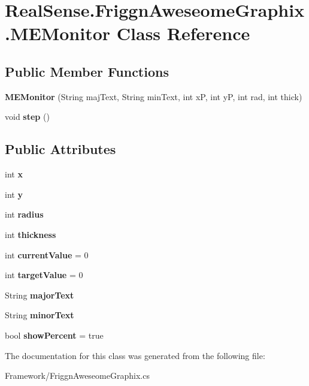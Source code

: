 \section{Real\+Sense.\+Friggn\+Aweseome\+Graphix.\+M\+E\+Monitor Class Reference}
\label{class_real_sense_1_1_friggn_aweseome_graphix_1_1_m_e_monitor}
\subsection*{Public Member Functions}
\begin{DoxyCompactItemize}
\item 
\mbox{\label{class_real_sense_1_1_friggn_aweseome_graphix_1_1_m_e_monitor_a8df7ffb411949e73cc37344326d325a3}} 
{\bfseries M\+E\+Monitor} (String maj\+Text, String min\+Text, int xP, int yP, int rad, int thick)
\item 
\mbox{\label{class_real_sense_1_1_friggn_aweseome_graphix_1_1_m_e_monitor_a59efc180805be50c7ed2a7b37e0aa0ef}} 
void {\bfseries step} ()
\end{DoxyCompactItemize}
\subsection*{Public Attributes}
\begin{DoxyCompactItemize}
\item 
\mbox{\label{class_real_sense_1_1_friggn_aweseome_graphix_1_1_m_e_monitor_aae94a9af9eba40d10677cffeee537737}} 
int {\bfseries x}
\item 
\mbox{\label{class_real_sense_1_1_friggn_aweseome_graphix_1_1_m_e_monitor_a05c8b06b952fbdfff729f92498996212}} 
int {\bfseries y}
\item 
\mbox{\label{class_real_sense_1_1_friggn_aweseome_graphix_1_1_m_e_monitor_aac6a6a6847e001a75e2b2316386ee864}} 
int {\bfseries radius}
\item 
\mbox{\label{class_real_sense_1_1_friggn_aweseome_graphix_1_1_m_e_monitor_abb4069ab5c96cb77807c8ec988073bb0}} 
int {\bfseries thickness}
\item 
\mbox{\label{class_real_sense_1_1_friggn_aweseome_graphix_1_1_m_e_monitor_adc8792c41789b6f038d7dc5d5c6e7496}} 
int {\bfseries current\+Value} = 0
\item 
\mbox{\label{class_real_sense_1_1_friggn_aweseome_graphix_1_1_m_e_monitor_aa73071b1e565f6765783baf18ce5b2c7}} 
int {\bfseries target\+Value} = 0
\item 
\mbox{\label{class_real_sense_1_1_friggn_aweseome_graphix_1_1_m_e_monitor_a4cdd7aad6b3e84b9429518891618b195}} 
String {\bfseries major\+Text}
\item 
\mbox{\label{class_real_sense_1_1_friggn_aweseome_graphix_1_1_m_e_monitor_a6bbf9a1ee06067597b933da3e34e3ee5}} 
String {\bfseries minor\+Text}
\item 
\mbox{\label{class_real_sense_1_1_friggn_aweseome_graphix_1_1_m_e_monitor_a4a07682a2e90f7433ae6fdb9df8f9b97}} 
bool {\bfseries show\+Percent} = true
\end{DoxyCompactItemize}


The documentation for this class was generated from the following file\+:\begin{DoxyCompactItemize}
\item 
Framework/Friggn\+Aweseome\+Graphix.\+cs\end{DoxyCompactItemize}
